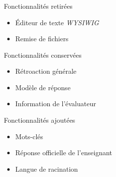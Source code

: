 \documentclass{beamer}
\begin{document}
  \begin{frame}
    \frametitle{\insertsection}
    \begin{block}{Fonctionnalit\'es retir\'ees}
      \begin{itemize}
        \item \'Editeur de texte \textit{WYSIWIG}
        \item Remise de fichiers
      \end{itemize}
    \end{block}
    
    \vfill
  
    \begin{block}{Fonctionnalit\'es conserv\'ees}
      \begin{itemize}
        \item R\'etroaction g\'en\'erale
        \item Mod\`ele de r\'eponse
        \item Information de l'\'evaluateur
      \end{itemize}
    \end{block}
    
    \vfill
  
    \begin{block}{Fonctionnalit\'es ajout\'ees}
      \begin{itemize}
        \item Mots-cl\'es
        \item R\'eponse officielle de l'enseignant
        \item Langue de racination
      \end{itemize}
    \end{block}
    \vfill
  \end{frame}
  
\end{document}
